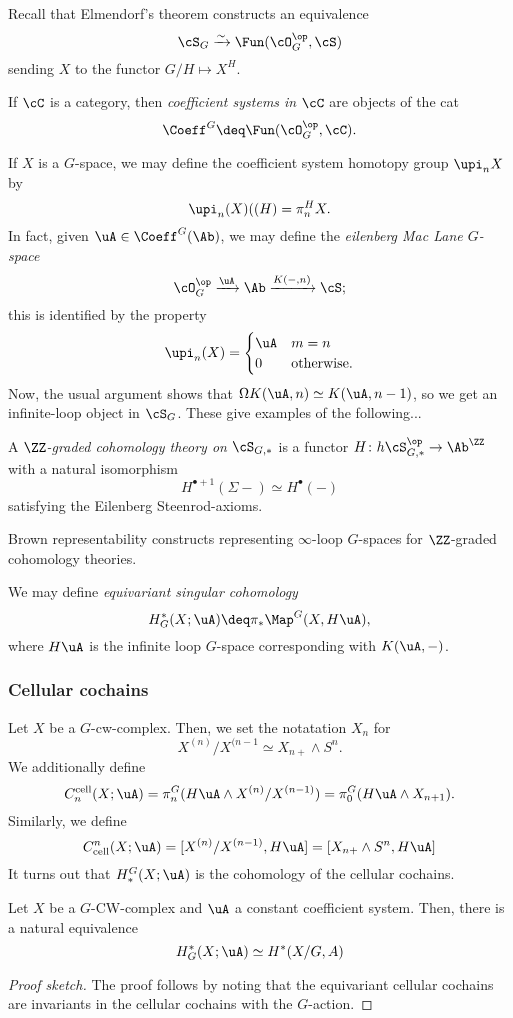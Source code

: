 Recall that Elmendorf's theorem constructs an equivalence
\[
  \cS_G \xrightarrow\sim \Fun(\cO_G^{\op}, \cS)
\]
sending $X$ to the functor $G/H \mapsto X^H$.
\begin{definition}
  If $\cC$ is a category, then \emph{coefficient systems in $\cC$} are objects of the cat
  \[
    \Coeff^G \deq \Fun(\cO_G^{\op},\cC).
  \]
\end{definition}

If $X$ is a $G$-space, we may define the coefficient system homotopy group $\upi_nX$ by
\[
  \upi_n(X)((H) = \pi_n^H X.
\]
In fact, given $\uA \in \Coeff^G(\Ab)$, we may define the \emph{eilenberg Mac Lane $G$-space}
\[
  \cO_G^{\op} \xrightarrow{\uA} \Ab \xrightarrow{K(-,n)} \cS;
\]
this is identified by the property
\[
  \upi_n(X) = \begin{cases}
    \uA & m = n \\ 
    0 & \mathrm{otherwise}. 
  \end{cases}
\]
Now, the usual argument shows that $\Omega K(\uA,n) \simeq K(\uA,n-1)$, so we get an infinite-loop object in $\cS_G$.
These give examples of the following...
\begin{definition}
  A \emph{$\ZZ$-graded cohomology theory on $\cS_{G,*}$} is a functor $H\colon h \cS_{G,*}^{\op} \rightarrow \Ab^{\ZZ}$ with a natural isomorphism
  \[
    H^{\bullet + 1}(\Sigma -) \simeq H^\bullet(-)
  \]
  satisfying the Eilenberg Steenrod-axioms.
\end{definition}
Brown representability constructs representing $\infty$-loop $G$-spaces for $\ZZ$-graded cohomology theories.
\begin{example}
  We may define \emph{equivariant singular cohomology}
  \[
    H^*_G(X;\uA) \deq \pi_* \Map^G(X,H\uA),
  \]
  where $H\uA$ is the infinite loop $G$-space corresponding with $K(\uA,-)$.
\end{example}

\subsubsection{Cellular cochains}%
Let $X$ be a $G$-cw-complex.
Then, we set the notatation $X_{n}$ for
\[
  X^{(n)}/X^{(n-1} \simeq X_{n+} \wedge S^n.
\]
We additionally define
\[
  C_n^{\mathrm{cell}}(X;\uA) = \pi_n^G(H\uA \wedge X^{(n)}/X^{(n-1)}) = \pi_0^G(H\uA \wedge X_{n+1}). 
\]
Similarly, we define
\[
  C^n_{\mathrm{cell}}(X;\uA) = [X^{(n)}/X^{(n-1)},H\uA] = [X_{n+} \wedge S^n, H\uA]
\]
It turns out that $H_*^G(X;\uA)$ is the cohomology of the cellular cochains.
\begin{lemma}\label{blah lem}
  Let $X$ be a $G$-CW-complex and $\uA$ a constant coefficient system.
  Then, there is a natural equivalence
    \[
      H^*_G(X;\uA) \simeq H^*(X/G,A)
    \]
\end{lemma}
\begin{proof}[Proof sketch]
  The proof follows by noting that the equivariant cellular cochains are invariants in the cellular cochains with the $G$-action.
\end{proof}

